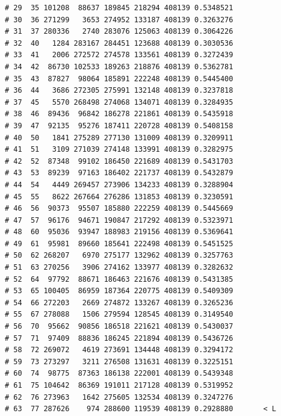 \documentclass{article}\usepackage[]{graphicx}\usepackage[]{color}
\makeatletter
\newenvironment{kframe}{%
 \def\at@end@of@kframe{}%
 \ifinner\ifhmode%
  \def\at@end@of@kframe{\end{minipage}}%
  \begin{minipage}{\columnwidth}%
 \fi\fi%
 \def\FrameCommand##1{\hskip\@totalleftmargin \hskip-\fboxsep
 \colorbox{shadecolor}{##1}\hskip-\fboxsep
     \hskip-\linewidth \hskip-\@totalleftmargin \hskip\columnwidth}%
 \MakeFramed {\advance\hsize-\width
   \@totalleftmargin\z@ \linewidth\hsize
   \@setminipage}}%
 {\par\unskip\endMakeFramed%
 \at@end@of@kframe}
\newenvironment{knitrout}{}{} %
\makeatother
\begin{document}
\begin{knitrout}
\begin{kframe}
\begin{verbatim}
# 29  35 101208  88637 189845 218294 408139 0.5348521          
# 30  36 271299   3653 274952 133187 408139 0.3263276          
# 31  37 280336   2740 283076 125063 408139 0.3064226          
# 32  40   1284 283167 284451 123688 408139 0.3030536          
# 33  41   2006 272572 274578 133561 408139 0.3272439          
# 34  42  86730 102533 189263 218876 408139 0.5362781          
# 35  43  87827  98064 185891 222248 408139 0.5445400          
# 36  44   3686 272305 275991 132148 408139 0.3237818          
# 37  45   5570 268498 274068 134071 408139 0.3284935          
# 38  46  89436  96842 186278 221861 408139 0.5435918          
# 39  47  92135  95276 187411 220728 408139 0.5408158          
# 40  50   1841 275289 277130 131009 408139 0.3209911          
# 41  51   3109 271039 274148 133991 408139 0.3282975          
# 42  52  87348  99102 186450 221689 408139 0.5431703          
# 43  53  89239  97163 186402 221737 408139 0.5432879          
# 44  54   4449 269457 273906 134233 408139 0.3288904          
# 45  55   8622 267664 276286 131853 408139 0.3230591          
# 46  56  90373  95507 185880 222259 408139 0.5445669          
# 47  57  96176  94671 190847 217292 408139 0.5323971          
# 48  60  95036  93947 188983 219156 408139 0.5369641          
# 49  61  95981  89660 185641 222498 408139 0.5451525          
# 50  62 268207   6970 275177 132962 408139 0.3257763          
# 51  63 270256   3906 274162 133977 408139 0.3282632          
# 52  64  97792  88671 186463 221676 408139 0.5431385          
# 53  65 100405  86959 187364 220775 408139 0.5409309          
# 54  66 272203   2669 274872 133267 408139 0.3265236          
# 55  67 278088   1506 279594 128545 408139 0.3149540          
# 56  70  95662  90856 186518 221621 408139 0.5430037          
# 57  71  97409  88836 186245 221894 408139 0.5436726          
# 58  72 269072   4619 273691 134448 408139 0.3294172          
# 59  73 273297   3211 276508 131631 408139 0.3225151          
# 60  74  98775  87363 186138 222001 408139 0.5439348          
# 61  75 104642  86369 191011 217128 408139 0.5319952          
# 62  76 273963   1642 275605 132534 408139 0.3247276          
# 63  77 287626    974 288600 119539 408139 0.2928880       < L
\end{verbatim}
\end{kframe}
\end{knitrout}
\end{document}
